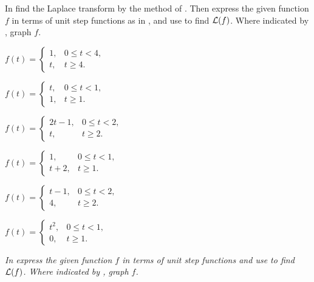 \exercises
In  find the Laplace transform by
the method of . Then express the given function
$f$ in terms of unit step functions as in , and use
 to find ${\mathcal L}(f)$.
Where indicated by \CGex, graph $f$.
\begin{exerciselistTwoColumn}

\item\label{exer:8.4.1}$f(t)=\begin{cases}
1,&0 \le t<4,\\
t,&t\ge4.\end{cases}$
\item\label{exer:8.4.2}$f(t)=\begin{cases}
t,&0 \le t<1,\\
1,&t\ge1.\end{cases}$
\item\label{exer:8.4.3}\CGex $f(t)=\begin{cases}
2t-1,& 0\le t<2,\\
t,&t\ge2.\end{cases}$
\item\label{exer:8.4.4}\CGex $f(t)=\begin{cases}
1, &0\le t<1,\\
t+2,&t\ge1.\end{cases}$
\item\label{exer:8.4.5}$f(t)=\begin{cases}
t-1,& 0\le t<2,\\
4,&t\ge2.\end{cases}$
\item\label{exer:8.4.6}$f(t)=\begin{cases}
t^2,& 0\le t<1,\\
0,&t\ge1.\end{cases}$
\end{exerciselistTwoColumn}
%
\textsl{In  express the
given function $f$ in terms of unit step functions
 and use  to find ${\mathcal L}(f)$.
Where indicated by \CGex, graph $f$.}
